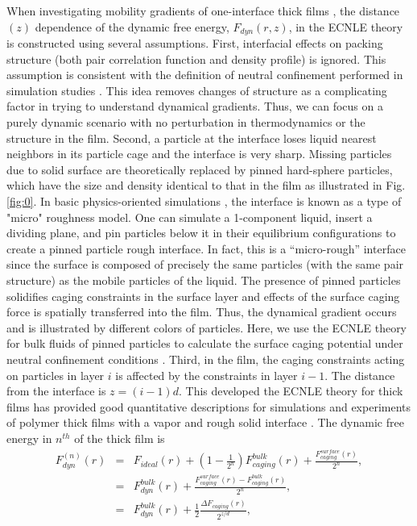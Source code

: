 \documentclass[twocolumn,preprintnumbers,amsmath,amssymb,superscriptaddress]{revtex4}
\begin{document}
When investigating mobility gradients of one-interface thick films \cite{3,4,8}, the distance $(z)$ dependence of the dynamic free energy, $F_{dyn}(r,z)$, in the ECNLE theory is constructed using several assumptions. First, interfacial effects on packing structure (both pair correlation function and density profile) is ignored. This assumption is consistent with the definition of neutral confinement performed in simulation studies \cite{3,17,15,25,26}. This idea removes changes of structure as a complicating factor in trying to understand dynamical gradients. Thus, we can focus on a purely dynamic scenario with no perturbation in thermodynamics or the structure in the film. Second, a particle at the interface loses liquid nearest neighbors in its particle cage and the interface is very sharp. Missing particles due to solid surface are theoretically replaced by pinned hard-sphere particles, which have the size and density identical to that in the film \cite{12} as illustrated in Fig. \ref{fig:0}. In basic physics-oriented simulations \cite{17,15,25,26}, the interface is known as a type of "micro" roughness model. One can simulate a 1-component liquid, insert a dividing plane, and pin particles below it in their equilibrium configurations to create a pinned particle rough interface. In fact, this is a “micro-rough” interface since the surface is composed of precisely the same particles (with the same pair structure) as the mobile particles of the liquid. The presence of pinned particles solidifies caging constraints in the surface layer and effects of the surface caging force is spatially transferred into the film. Thus, the dynamical gradient occurs and is illustrated by different colors of particles. Here, we use the ECNLE theory for bulk fluids of pinned particles to calculate the surface caging potential under neutral confinement conditions \cite{12}. Third, in the film, the caging constraints acting on particles in layer $i$ is affected by the constraints in layer $i-1$. The distance from the interface is $z=(i-1)d$. This developed the ECNLE theory for thick films has provided good quantitative descriptions for simulations and experiments of polymer thick films with a vapor and rough solid interface \cite{3,4,8}. The dynamic free energy in $n^{th}$ of the thick film is
\begin{eqnarray}
F_{dyn}^{(n)}(r) &=& F_{ideal}(r) + \left(1-\frac{1}{2^n}\right)F_{caging}^{bulk}(r)  +
 \frac{F_{caging}^{surface}(r)}{2^n}, \nonumber\\
 &=& F_{dyn}^{bulk}(r) + \frac{F_{caging}^{surface}(r)-F_{caging}^{bulk}(r)}{2^n},\nonumber\\
  &=& F_{dyn}^{bulk}(r) + \frac{1}{2}\frac{\Delta F_{caging}(r)}{2^{z/d}},
\label{eq:2}
\end{eqnarray}
\end{document}
